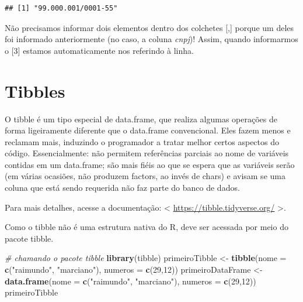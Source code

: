 \documentclass[
]{book}
\newenvironment{Shaded}{\begin{snugshade}}{\end{snugshade}}
\newcommand{\CommentTok}[1]{\textcolor[rgb]{0.56,0.35,0.01}{\textit{#1}}}
\newcommand{\DataTypeTok}[1]{\textcolor[rgb]{0.13,0.29,0.53}{#1}}
\newcommand{\DecValTok}[1]{\textcolor[rgb]{0.00,0.00,0.81}{#1}}
\newcommand{\KeywordTok}[1]{\textcolor[rgb]{0.13,0.29,0.53}{\textbf{#1}}}
\newcommand{\NormalTok}[1]{#1}
\newcommand{\OperatorTok}[1]{\textcolor[rgb]{0.81,0.36,0.00}{\textbf{#1}}}
\newcommand{\StringTok}[1]{\textcolor[rgb]{0.31,0.60,0.02}{#1}}
\begin{document}
\begin{Shaded}
\end{Shaded}

\begin{verbatim}
## [1] "99.000.001/0001-55"
\end{verbatim}

Não precisamos informar dois elementos dentro dos colchetes {[},{]} porque um deles foi informado anteriormente (no caso, a coluna \emph{cnpj})! Assim, quando informarmos o {[}3{]} estamos automaticamente nos referindo à linha.

\hypertarget{tibbles}{%
\section{Tibbles}\label{tibbles}}

O tibble é um tipo especial de data.frame, que realiza algumas operações de forma ligeiramente diferente que o data.frame convencional. Eles fazem menos e reclamam mais, induzindo o programador a tratar melhor certos aspectos do código. Essencialmente: não permitem referências parciais ao nome de variáveis contidas em um data.frame; são mais fiéis ao que se espera que as variáveis serão (em várias ocasiões, não produzem factors, ao invés de chars) e avisam se uma coluna que está sendo requerida não faz parte do banco de dados.

Para mais detalhes, acesse a documentação: \textless{} \url{https://tibble.tidyverse.org/} \textgreater.

Como o tibble não é uma estrutura nativa do R, deve ser acessada por meio do pacote tibble.

\begin{Shaded}
\begin{Highlighting}[]
\CommentTok{# chamando o pacote tibble}
\KeywordTok{library}\NormalTok{(tibble)}
\NormalTok{primeiroTibble <-}\StringTok{ }\KeywordTok{tibble}\NormalTok{(}\DataTypeTok{nome =} \KeywordTok{c}\NormalTok{(}\StringTok{"raimundo"}\NormalTok{, }\StringTok{"marciano"}\NormalTok{), }\DataTypeTok{numeros =} \KeywordTok{c}\NormalTok{(}\DecValTok{29}\NormalTok{,}\DecValTok{12}\NormalTok{))}
\NormalTok{primeiroDataFrame <-}\StringTok{ }\KeywordTok{data.frame}\NormalTok{(}\DataTypeTok{nome =} \KeywordTok{c}\NormalTok{(}\StringTok{"raimundo"}\NormalTok{, }\StringTok{"marciano"}\NormalTok{), }\DataTypeTok{numeros =} \KeywordTok{c}\NormalTok{(}\DecValTok{29}\NormalTok{,}\DecValTok{12}\NormalTok{))}
\NormalTok{primeiroTibble}
\end{Highlighting}
\end{Shaded}
\end{document}
